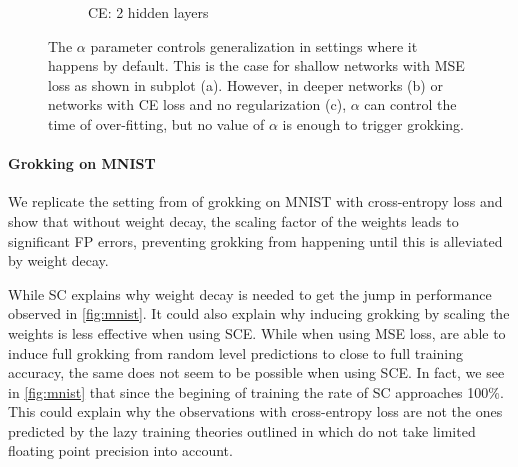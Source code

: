 \begin{figure}[t]
\begin{subfigure}{.33\textwidth}
  \caption{CE: 2 hidden layers}
\end{subfigure}
\caption{The $\alpha$ parameter controls generalization in settings where it happens by default. This is the case for shallow networks with MSE loss as shown in subplot (a). However, in deeper networks (b) or networks with CE loss and no regularization (c), $\alpha$ can control the time of over-fitting, but no value of $\alpha$ is enough to trigger grokking.}
\label{fig:alpha_parameter}
\end{figure}

\paragraph{Grokking on MNIST} We replicate the setting from \cite{liu2023grokking} of grokking on MNIST with cross-entropy loss and show that without weight decay, the scaling factor of the weights leads to significant FP errors, preventing grokking from happening until this is alleviated by weight decay. 

While SC explains why weight decay is needed to get the jump in performance observed in \cref{fig:mnist}. It could also explain why inducing grokking by scaling the weights is less effective when using SCE. While when using MSE loss, \cite{liu2023omnigrok} are able to induce full grokking from random level predictions to close to full training accuracy, the same does not seem to be possible when using SCE. In fact, we see in \cref{fig:mnist} that since the begining of training the rate of SC approaches 100\%. This could explain why the observations with cross-entropy loss are not the ones predicted by the lazy training theories outlined in \cite{Kumar2023-hz} which do not take limited floating point precision into account.

